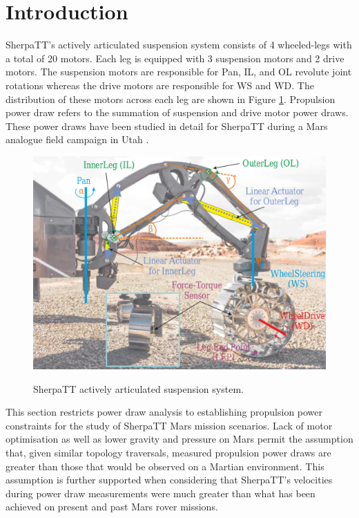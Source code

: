 \section{Introduction}
\label{sec:PropulsionPowerConstraints:Introduction}
SherpaTT's actively articulated suspension system consists of 4 wheeled-legs with a total of 20 motors. Each leg is equipped with 3 suspension motors and 2 drive motors. The suspension motors are responsible for Pan, \ac{IL}, and \ac{OL} revolute joint rotations whereas the drive motors are responsible for \ac{WS} and \ac{WD}. The distribution of these motors across each leg are shown in Figure \ref{fig:sherpatt-actively-articulated-suspension-system}. Propulsion power draw refers to the summation of suspension and drive motor power draws. These power draws have been studied in detail for SherpaTT during a Mars analogue field campaign in Utah .

\begin{figure}[h]
  \centering
  \hypersetup{linkcolor=captionTextColor}
  \includegraphics[width=0.8\linewidth]{sections/locomotion-power-draws/images/sherpatt-actively-articulated-suspension-sytem.png}\\
  \caption[SherpaTT actively articulated suspension system]
          {SherpaTT actively articulated suspension system.}
  \label{fig:sherpatt-actively-articulated-suspension-system}
\end{figure}

 This section restricts power draw analysis to establishing propulsion power constraints for the study of SherpaTT Mars mission scenarios. Lack of motor optimisation as well as lower gravity and pressure on Mars permit the assumption that, given similar topology traversals, measured propulsion power draws are greater than those that would be observed on a Martian environment. This assumption is further supported when considering that SherpaTT's velocities during power draw measurements were much greater than what has been achieved on present and past Mars rover missions.


